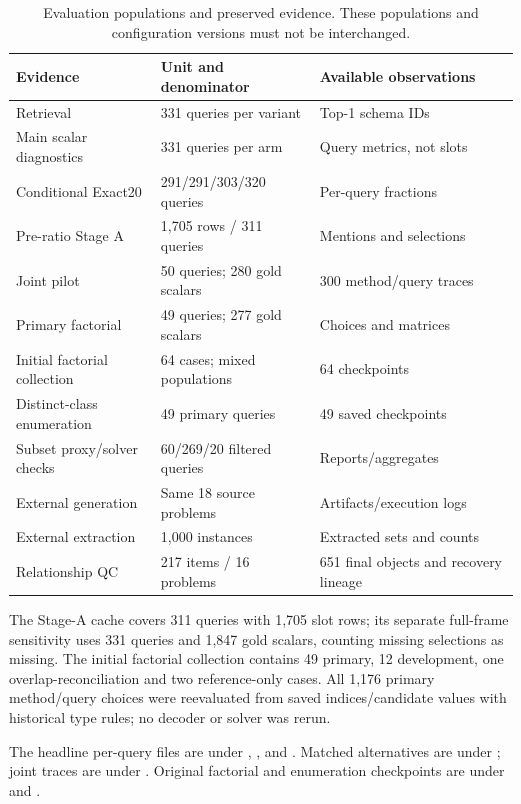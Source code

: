 \begin{table}[htbp]
\centering\small
\caption{Evaluation populations and preserved evidence. These populations
and configuration versions must not be interchanged.}
\label{tab:population-map}
\begin{tabularx}{\linewidth}{@{}lXl@{}}
\toprule
Evidence & Unit and denominator & Available observations\\
\midrule
Retrieval & 331 queries per variant & Top-1 schema IDs\\
Main scalar diagnostics & 331 queries per arm & Query metrics, not slots\\
Conditional Exact20 & 291/291/303/320 queries & Per-query fractions\\
Pre-ratio Stage A & 1,705 rows / 311 queries & Mentions and selections\\
Joint pilot & 50 queries; 280 gold scalars & 300 method/query traces\\
Primary factorial & 49 queries; 277 gold scalars & Choices and matrices\\
Initial factorial collection & 64 cases; mixed populations & 64 checkpoints\\
Distinct-class enumeration & 49 primary queries & 49 saved checkpoints\\
Subset proxy/solver checks & 60/269/20 filtered queries & Reports/aggregates\\
External generation & Same 18 source problems & Artifacts/execution logs\\
External extraction & 1,000 instances & Extracted sets and counts\\
Relationship QC & 217 items / 16 problems & 651 final objects and recovery lineage\\
\bottomrule
\end{tabularx}
\end{table}

The Stage-A cache covers 311 queries with 1,705 slot rows; its separate full-frame sensitivity uses 331 queries and 1,847 gold scalars, counting missing selections as missing. The initial factorial collection contains 49 primary, 12 development, one overlap-reconciliation and two reference-only cases. All 1,176 primary method/query choices were reevaluated from saved indices/candidate values with historical type rules; no decoder or solver was rerun.

The headline per-query files are under , ,  and . Matched alternatives are under ; joint traces are under . Original factorial and enumeration checkpoints are under  and .

